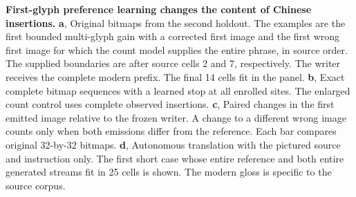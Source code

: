 \textbf{First-glyph preference learning changes the content of Chinese insertions.}
\textbf{a}, Original bitmaps from the second holdout. The examples are the first bounded multi-glyph gain with a corrected first image and the first wrong first image for which the count model supplies the entire phrase, in source order. The supplied boundaries are after source cells 2 and 7, respectively. The writer receives the complete modern prefix. The final 14 cells fit in the panel.
\textbf{b}, Exact complete bitmap sequences with a learned stop at all enrolled sites. The enlarged count control uses complete observed insertions. \textbf{c}, Paired changes in the first emitted image relative to the frozen writer. A change to a different wrong image counts only when both emissions differ from the reference. Each bar compares original 32-by-32 bitmaps. \textbf{d}, Autonomous translation with the pictured source and instruction only. The first short case whose entire reference and both entire generated streams fit in 25 cells is shown. The modern gloss is specific to the source corpus.
